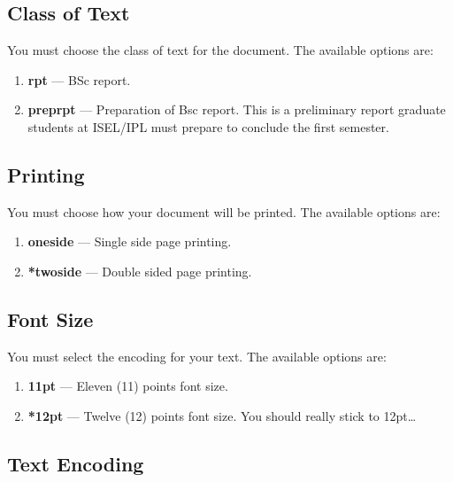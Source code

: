 \subsection{Class of Text} %
\label{sub:class_of_text}

You must choose the class of text for the document. The available options are:

\begin{enumerate}
	\item \textbf{rpt} --- BSc report.
	\item \textbf{preprpt} --- Preparation of Bsc report. This is a preliminary report graduate students at ISEL/IPL must prepare to conclude the first semester.
\end{enumerate}
%
\subsection{Printing} %
\label{sub:printing}

You must choose how your document will be printed. The available options are:
\begin{enumerate}
	\item \textbf{oneside} --- Single side page printing.
	\item \textbf{*twoside} --- Double sided page printing.
\end{enumerate}

\subsection{Font Size} %
\label{ssec:font_size}

You must select the encoding for your text. The available options are:
\begin{enumerate}
	\item \textbf{11pt} --- Eleven (11) points font size.
	\item \textbf{*12pt} --- Twelve (12) points font size. You should really stick to 12pt\ldots
\end{enumerate}

\subsection{Text Encoding} %
\label{ssec:text_encoding}

